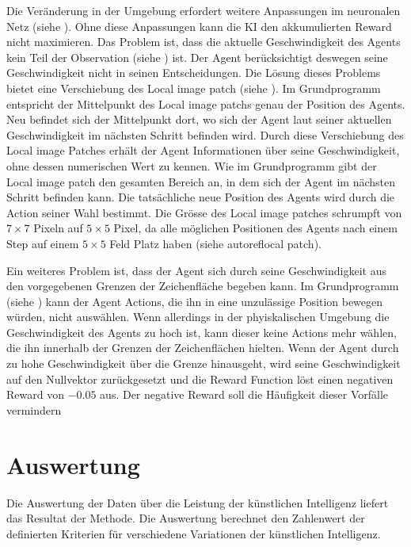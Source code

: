 Die Veränderung in der Umgebung erfordert weitere Anpassungen im neuronalen Netz
(siehe ). Ohne diese Anpassungen kann die KI den
akkumulierten Reward nicht maximieren. Das Problem ist, dass die aktuelle
Geschwindigkeit des Agents kein Teil der Observation (siehe
) ist. Der Agent berücksichtigt deswegen seine
Geschwindigkeit nicht in seinen Entscheidungen. Die Lösung dieses Problems
bietet eine Verschiebung des Local image patch (siehe ).
Im Grundprogramm entspricht der Mittelpunkt des Local image patchs genau der
Position des Agents. Neu befindet sich der Mittelpunkt dort, wo sich der Agent
laut seiner aktuellen Geschwindigkeit im nächsten Schritt befinden wird. Durch
diese Verschiebung des Local image Patches erhält der Agent Informationen über
seine Geschwindigkeit, ohne dessen numerischen Wert zu kennen. Wie im
Grundprogramm gibt der Local image patch den gesamten Bereich an, in dem sich
der Agent im nächsten Schritt befinden kann. Die tatsächliche neue Position des
Agents wird durch die Action seiner Wahl bestimmt. Die Grösse des Local image
patches schrumpft von $7\times7$ Pixeln auf $5\times5$ Pixel, da alle möglichen
Positionen des Agents nach einem Step auf einem $5\times5$ Feld Platz haben
(siehe autoref{local patch}). 


Ein weiteres Problem ist, dass der Agent sich durch seine Geschwindigkeit aus
den vorgegebenen Grenzen der Zeichenfläche begeben kann. Im Grundprogramm  
(siehe ) kann der Agent Actions, die ihn in eine
unzulässige Position bewegen würden, nicht auswählen. Wenn allerdings in der
phyiskalischen Umgebung die Geschwindigkeit des Agents zu
hoch ist, kann dieser keine Actions mehr wählen, die ihn innerhalb der Grenzen
der Zeichenflächen hielten. Wenn der Agent durch zu hohe Geschwindigkeit
über die Grenze hinausgeht, wird seine Geschwindigkeit auf den Nullvektor
zurückgesetzt und die Reward Function löst einen negativen Reward von $-0.05$
aus. Der negative Reward soll die Häufigkeit dieser Vorfälle vermindern


\section{Auswertung}
\label{chap:m_auswert}
Die Auswertung der Daten über die Leistung der künstlichen Intelligenz liefert
das Resultat der Methode. Die Auswertung berechnet den Zahlenwert der
definierten Kriterien für verschiedene Variationen der künstlichen Intelligenz.

